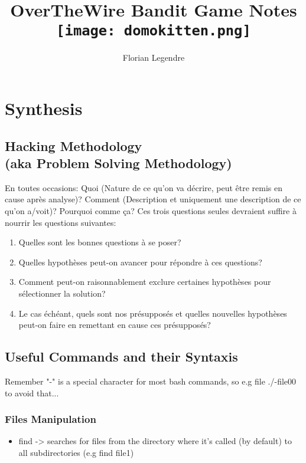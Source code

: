 \documentclass[a4paper]{report}
\title{
		OverTheWire Bandit Game Notes \\
		\vspace{5mm}
		\texttt{[image: domokitten.png]}
	  }
\author{Florian Legendre}
\begin{document}
\maketitle

\tableofcontents

\part{Synthesis}

\chapter{Hacking Methodology \\ (aka Problem Solving Methodology)}
En toutes occasions: Quoi (Nature de ce qu'on va décrire, peut être remis en cause après analyse)? Comment (Description et uniquement une description de ce qu'on a/voit)? Pourquoi comme ça? Ces trois questions seules devraient suffire à nourrir les questions suivantes:
\begin{enumerate}

\item Quelles sont les bonnes questions à se poser?
\item Quelles hypothèses peut-on avancer pour répondre à ces questions?
\item Comment peut-on raisonnablement exclure certaines hypothèses pour sélectionner la solution?
\item Le cas échéant, quels sont nos présupposés et quelles nouvelles hypothèses peut-on faire en remettant en cause ces présupposés?
\end{enumerate}



\chapter{Useful Commands and their Syntaxis}
Remember "-" is a special character for most bash commands, so e.g file ./-file00 to avoid that...

\section{Files Manipulation}
\begin{itemize}
\item find -> searches for files 
	   from the directory where it's called (by default) to all subdirectories
	   (e.g find file1) 
\end{itemize}
\end{document}
